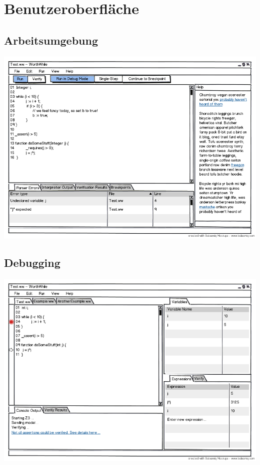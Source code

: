 \section{Benutzeroberfläche}%

\subsection{Arbeitsumgebung}%

\includegraphics[width=\textwidth]{mockup/editor.png}

\subsection{Debugging}%

\includegraphics[width=\textwidth]{mockup/debug.png}
